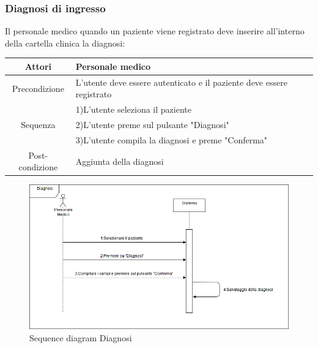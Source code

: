 \documentclass[a4paper]{report}
\begin{document}
            \subsubsection{Diagnosi di ingresso}
                Il personale medico quando un paziente viene registrato deve inserire all'interno della cartella clinica la diagnosi:
                \begin{table}[htbp]
                    \begin{tabular}{|c|l|}
                        \hline
                        Attori & Personale medico \\\hline
                    Precondizione & L'utente deve essere autenticato e il paziente deve essere registrato \\\hline
                     & 1)L'utente seleziona il paziente \\
                    Sequenza & 2)L'utente preme sul pulsante "Diagnosi" \\
                      & 3)L'utente compila la diagnosi e preme "Conferma" \\\hline
                    Post-condizione & Aggiunta della diagnosi  \\\hline
                    \end{tabular}
                \end{table}
                 \begin{figure}[htbp]
                    \centering
                     \includegraphics[scale=0.4]{Diagnosi.png}
                        \caption{Sequence diagram Diagnosi}
                \end{figure}
                
                
            \newpage
\end{document}
